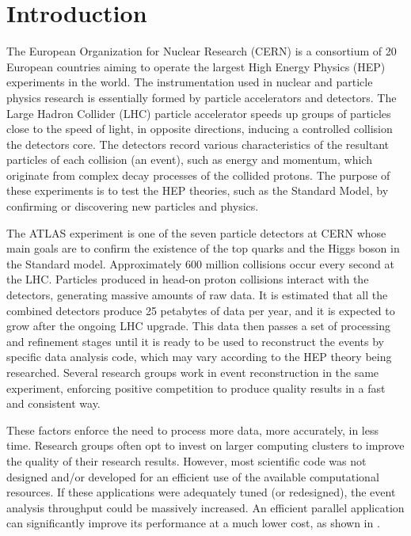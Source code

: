 \section{Introduction}
\label{introduction}

The European Organization for Nuclear Research (CERN) is a consortium of 20 European countries aiming to operate the largest High Energy Physics (HEP) experiments in the world. The instrumentation used in nuclear and particle physics research is essentially formed by particle accelerators and detectors. The Large Hadron Collider (LHC) particle accelerator speeds up groups of particles close to the speed of light, in opposite directions, inducing a controlled collision the detectors core. The detectors record various characteristics of the resultant particles of each collision (an event), such as energy and momentum, which originate from complex decay processes of the collided protons. The purpose of these experiments is to test the HEP theories, such as the Standard Model, by confirming or discovering new particles and physics.

The ATLAS experiment is one of the seven particle detectors at CERN whose main goals are to confirm the existence of the top quarks and the Higgs boson in the Standard model. Approximately 600 million collisions occur every second at the LHC. Particles produced in head-on proton collisions interact with the detectors, generating massive amounts of raw data. It is estimated that all the combined detectors produce 25 petabytes of data per year, and it is expected to grow after the ongoing LHC upgrade\cite{LIP:Ibergrid}. This data then passes a set of processing and refinement stages until it is ready to be used to reconstruct the events by specific data analysis code, which may vary according to the HEP theory being researched. Several research groups work in event reconstruction in the same experiment, enforcing positive competition to produce quality results in a fast and consistent way.

These factors enforce the need to process more data, more accurately, in less time. Research groups often opt to invest on larger computing clusters to improve the quality of their research results. However, most scientific code was not designed and/or developed for an efficient use of the available computational resources. If these applications were adequately tuned (or redesigned), the event analysis throughput could be massively increased. An efficient parallel application can significantly improve its performance at a much lower cost, as shown in \cite{Msc:AMP}.

